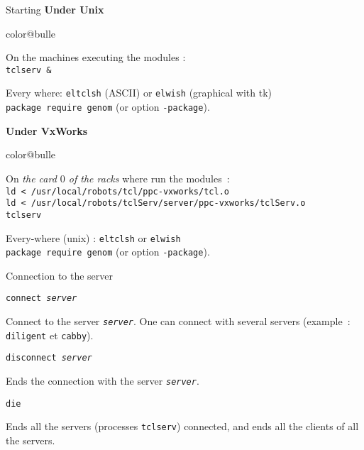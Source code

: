 \documentclass[a4paper,landscape,smooth]{show}
\begin{document}
\begin{tslide}{Starting}
   \vfill
   {\bf Under Unix}
   \begin{bitemize}{color@bulle}
      \item On the machines executing the modules :\\
	 \texttt{tclserv \&}

      \item Every where:
	 \texttt{eltclsh} (ASCII) or \texttt{elwish} (graphical with tk)\\
	 \texttt{package require genom} (or option \texttt{-package}).

   \end{bitemize}
   \vfill
   {\bf Under VxWorks}
   \begin{bitemize}{color@bulle}
      \item On {\em the card $0$ of the racks} where run the modules~:\\
	 \texttt{ld < /usr/local/robots/tcl/ppc-vxworks/tcl.o}\\
	 \texttt{ld < /usr/local/robots/tclServ/server/ppc-vxworks/tclServ.o}\\
	 \texttt{tclserv}

      \item Every-where (unix) :
	 \texttt{eltclsh} or \texttt{elwish}\\
	 \texttt{package require genom} (or option \texttt{-package}).

   \end{bitemize}
   \vfill
\end{tslide}


\begin{tslide}{Connection to the server}
   \vfill
   \begin{cartouche}
   \texttt{connect {\em server}}
   \end{cartouche}   
   Connect to the server \texttt{\em server}. One can connect with several servers (example~:
   \texttt{diligent} et \texttt{cabby}).
   \vfill
   \begin{cartouche}
   \texttt{disconnect {\em server}}
   \end{cartouche}   
   Ends the connection with the server \texttt{\em server}.
   \vfill
   \begin{cartouche}
   \texttt{die}
   \end{cartouche}   
   Ends all the servers (processes \texttt{tclserv}) connected, and
   ends all the clients of all the servers.
   \vfill
\end{tslide}
\end{document}
